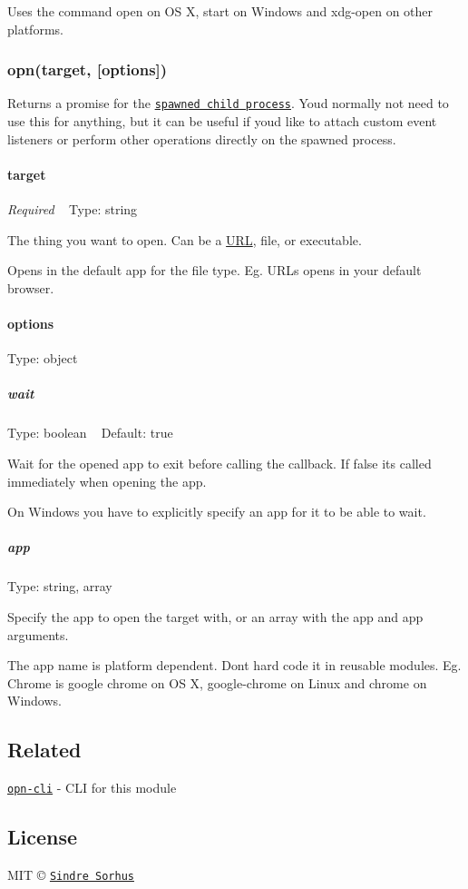 Uses the command {\ttfamily open} on OS X, {\ttfamily start} on Windows and {\ttfamily xdg-\/open} on other platforms.

\subsubsection*{opn(target, \mbox{[}options\mbox{]})}

Returns a promise for the \href{https://nodejs.org/api/child_process.html#child_process_class_childprocess}{\tt spawned child process}. You\textquotesingle{}d normally not need to use this for anything, but it can be useful if you\textquotesingle{}d like to attach custom event listeners or perform other operations directly on the spawned process.

\paragraph*{target}

{\itshape Required} ~\newline
Type\+: {\ttfamily string}

The thing you want to open. Can be a \mbox{\hyperlink{namespace_u_r_l}{U\+RL}}, file, or executable.

Opens in the default app for the file type. Eg. U\+R\+Ls opens in your default browser.

\paragraph*{options}

Type\+: {\ttfamily object}

\subparagraph*{wait}

Type\+: {\ttfamily boolean} ~\newline
Default\+: {\ttfamily true}

Wait for the opened app to exit before calling the {\ttfamily callback}. If {\ttfamily false} it\textquotesingle{}s called immediately when opening the app.

On Windows you have to explicitly specify an app for it to be able to wait.

\subparagraph*{app}

Type\+: {\ttfamily string}, {\ttfamily array}

Specify the app to open the {\ttfamily target} with, or an array with the app and app arguments.

The app name is platform dependent. Don\textquotesingle{}t hard code it in reusable modules. Eg. Chrome is {\ttfamily google chrome} on OS X, {\ttfamily google-\/chrome} on Linux and {\ttfamily chrome} on Windows.

\subsection*{Related}


\begin{DoxyItemize}
\item \href{https://github.com/sindresorhus/opn-cli}{\tt opn-\/cli} -\/ C\+LI for this module
\end{DoxyItemize}

\subsection*{License}

M\+IT © \href{http://sindresorhus.com}{\tt Sindre Sorhus} 